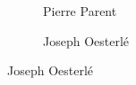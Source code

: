 \begin{frame}[plain]
\begin{figure}[h]
\begin{subfigure}{0.3\textwidth}
	\centering
	\caption{Pierre Parent}
	\end{subfigure} \hspace{0.05cm}
	\begin{subfigure}{0.3\textwidth}
	\captionsetup{labelformat=empty}
	\centering
	\caption{Joseph Oesterl\'e}
	\end{subfigure}
	\end{figure}
\end{frame}



